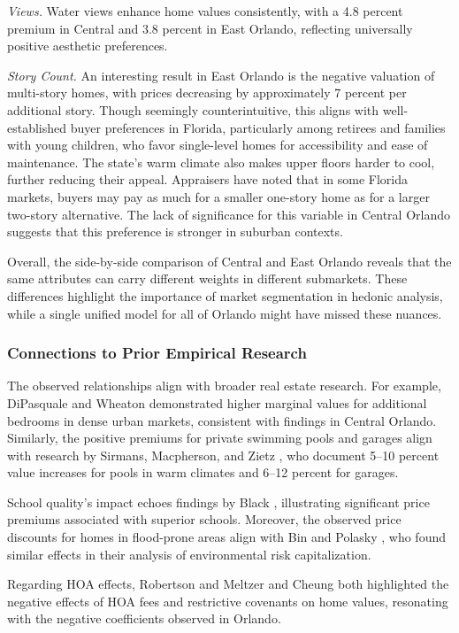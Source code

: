 \textit{Views.}
Water views enhance home values consistently, with a 4.8 percent premium in Central and 3.8 percent in East Orlando, reflecting universally positive aesthetic preferences.

\textit{Story Count.}
An interesting result in East Orlando is the negative valuation of multi-story homes, with prices decreasing by approximately 7 percent per additional story. Though seemingly counterintuitive, this aligns with well-established buyer preferences in Florida, particularly among retirees and families with young children, who favor single-level homes for accessibility and ease of maintenance. The state’s warm climate also makes upper floors harder to cool, further reducing their appeal. Appraisers have noted that in some Florida markets, buyers may pay as much for a smaller one-story home as for a larger two-story alternative. The lack of significance for this variable in Central Orlando suggests that this preference is stronger in suburban contexts.

Overall, the side-by-side comparison of Central and East Orlando reveals that the same attributes can carry different weights in different submarkets. These differences highlight the importance of market segmentation in hedonic analysis, while a single unified model for all of Orlando might have missed these nuances. 

\subsubsection*{Connections to Prior Empirical Research}
The observed relationships align with broader real estate research. For example, DiPasquale and Wheaton \citep{dipawill:1996} demonstrated higher marginal values for additional bedrooms in dense urban markets, consistent with findings in Central Orlando. Similarly, the positive premiums for private swimming pools and garages align with research by Sirmans, Macpherson, and Zietz \citep{sirmansEtAl:2006}, who document 5–10 percent  value increases for pools in warm climates and 6–12 percent  for garages.

School quality’s impact echoes findings by Black \citep{black:1999}, illustrating significant price premiums associated with superior schools. Moreover, the observed price discounts for homes in flood-prone areas align with Bin and Polasky \citep{binpola:2004}, who found similar effects in their analysis of environmental risk capitalization.

Regarding HOA effects, Robertson \citep{robertson:2019} and Meltzer and Cheung \citep{meltcheu:2014} both highlighted the negative effects of HOA fees and restrictive covenants on home values, resonating with the negative coefficients observed in Orlando.

